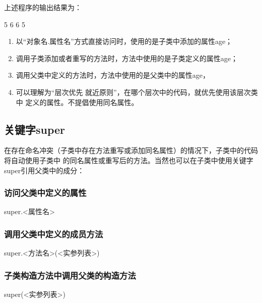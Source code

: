 上述程序的输出结果为：

\begin{stdoutCode}
  5
  6
  6
  5
\end{stdoutCode}


\begin{enumerate}
\item 以“对象名.属性名”方式直接访问时，使用的是子类中添加的属性age；
\item 调用子类添加或者重写的方法时，方法中使用的是子类定义的属性age；
\item 调用父类中定义的方法时，方法中使用的是父类中的属性age，
\item 可以理解为“层次优先 就近原则”，在哪个层次中的代码，就优先使用该层次类中
  定义的属性。不提倡使用同名属性。
\end{enumerate}

\subsection{关键字super} 

在存在命名冲突（子类中存在方法重写或添加同名属性）的情况下，子类中的代码将自动使用子类中
的同名属性或重写后的方法。当然也可以在子类中{\Red 使用关键字super引用父类中的成分}：

\subsubsection{访问父类中定义的属性}

\begin{javaCode}
  super.<属性名>  
\end{javaCode}

\subsubsection{调用父类中定义的成员方法}

\begin{javaCode}
  super.<方法名>(<实参列表>)
\end{javaCode}

\subsubsection{子类构造方法中调用父类的构造方法}

\begin{javaCode}
  super(<实参列表>)  
\end{javaCode}

